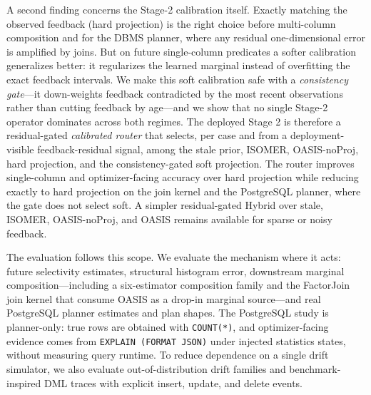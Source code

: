 \documentclass[preprint,12pt]{elsarticle}
\begin{document}
A second finding concerns the Stage-2 calibration itself. Exactly matching the
observed feedback (hard projection) is the right choice before multi-column
composition and for the DBMS planner, where any residual one-dimensional error is
amplified by joins. But on future single-column predicates a softer calibration
generalizes better: it regularizes the learned marginal instead of overfitting
the exact feedback intervals. We make this soft calibration safe with a
\emph{consistency gate}---it down-weights feedback contradicted by the most
recent observations rather than cutting feedback by age---and we show that no
single Stage-2 operator dominates across both regimes. The deployed Stage 2 is
therefore a residual-gated \emph{calibrated router} that selects, per case and
from a deployment-visible feedback-residual signal, among the stale prior,
ISOMER, OASIS-noProj, hard projection, and the consistency-gated soft projection.
The router improves single-column and optimizer-facing accuracy over hard
projection while reducing exactly to hard projection on the join kernel and the
PostgreSQL planner, where the gate does not select soft. A simpler residual-gated
Hybrid over stale, ISOMER, OASIS-noProj, and OASIS remains available for sparse or
noisy feedback.

The evaluation follows this scope. We evaluate the mechanism where it acts:
future selectivity estimates, structural histogram error, downstream marginal
composition---including a six-estimator composition family and the FactorJoin
join kernel that consume OASIS as a drop-in marginal source---and real
PostgreSQL planner estimates and plan shapes. The
PostgreSQL study is planner-only: true rows are obtained with
\texttt{COUNT(*)}, and optimizer-facing evidence comes from
\texttt{EXPLAIN (FORMAT JSON)} under injected statistics states, without
measuring query runtime. To reduce dependence on a single drift simulator, we
also evaluate out-of-distribution drift families and benchmark-inspired DML
traces with explicit insert, update, and delete events.
\end{document}

